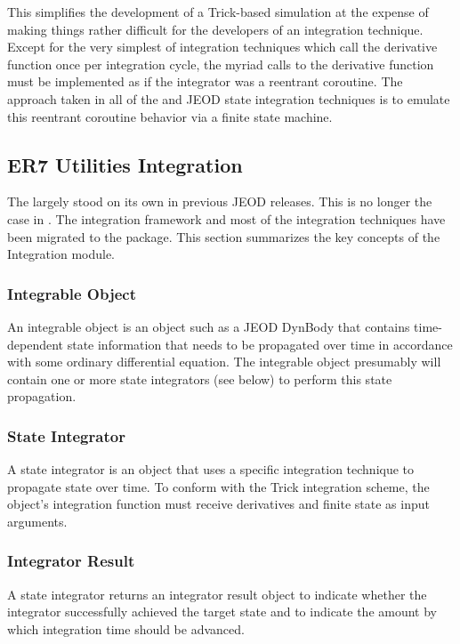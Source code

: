 This simplifies the development of a Trick-based simulation at the expense of
making things rather difficult for the developers of an integration technique.
Except for the very simplest of integration techniques which call the derivative
function once per integration cycle, the myriad calls to the derivative function
must be implemented as if the integrator was a reentrant coroutine.
The approach taken in all of the \erseven and JEOD state integration
techniques is to emulate this reentrant coroutine behavior via
a finite state machine.

\subsection{ER7 Utilities Integration} \label{sec:con_des_er7}

The \ModelDesc largely stood on its own in previous JEOD releases.
This is no longer the case in \JEODid.
The integration framework and most of the integration techniques have been
migrated to the \erseven package.
This section summarizes the key concepts of the \erseven Integration module.

\subsubsection{Integrable Object}
An integrable object is an object such as a JEOD DynBody that contains
time-dependent state information that needs to be propagated over time in
accordance with some ordinary differential equation.
The integrable object presumably will contain one or more state integrators
(see below) to perform this state propagation.

\subsubsection{State Integrator}
A state integrator is an object that uses a specific integration technique to
propagate state over time. To conform with the Trick integration scheme, the
object's integration function must receive derivatives and finite state as
input arguments.

\subsubsection{Integrator Result}
A state integrator returns an integrator result object to indicate whether
the integrator successfully achieved the target state and to indicate the
amount by which integration time should be advanced.

